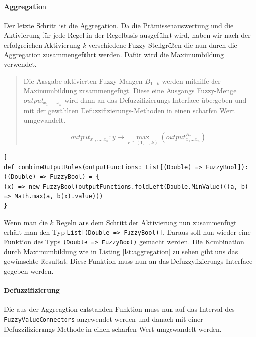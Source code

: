 \documentclass[12pt,a4paper,bibliography=totocnumbered,listof=totocnumbered, abstracton]{scrartcl}
\def\code#1{\texttt{#1}}
\theoremstyle{Umgebung}
\begin{document}
\paragraph{Aggregation}

Der letzte Schritt ist die Aggregation. Da die Prämissenauswertung und die Aktivierung für jede Regel in der Regelbasis ausgeführt wird, haben wir nach der erfolgreichen Aktivierung $k$ verschiedene Fuzzy-Stellgrößen die nun durch die Aggregation zusammengeführt werden. Dafür wird die Maximumbildung verwendet.

\begin{quote}
Die Ausgabe aktivierten Fuzzy-Mengen $B_{1...k}$ werden mithilfe der Maximumbildung zusammengefügt. Diese eine Ausgangs Fuzzy-Menge $	output_{x_1,..., x_n}$ wird dann an das Defuzzifizierungs-Interface übergeben und mit der gewählten Defuzzifizierungs-Methoden in einen scharfen Wert umgewandelt.

\begin{equation}
output_{x_1,..., x_n}: y \mapsto \max_{r \in (1,...,k)}(output^{R_r}_{x_1...x_n})
\end{equation}
\end{quote}

\begin{lstlisting}[firstnumber=1, style=myScalastyle, caption=Berechnung der Aggregation, label=lst:aggregation]]
def combineOutputRules(outputFunctions: List[(Double) => FuzzyBool]): ((Double) => FuzzyBool) = {
(x) => new FuzzyBool(outputFunctions.foldLeft(Double.MinValue)((a, b) => Math.max(a, b(x).value)))
}
\end{lstlisting}

Wenn man die $k$ Regeln aus dem Schritt der Aktivierung nun zusammenfügt erhält man den Typ \code{List[(Double => FuzzyBool)]}. Daraus soll nun wieder eine Funktion des Typs \code{(Double => FuzzyBool)} gemacht werden. Die Kombination durch Maximumbildung wie in Listing \ref{lst:aggregation} zu sehen gibt uns das gewünschte Resultat. Diese Funktion muss nun an das Defuzzyfizierungs-Interface gegeben werden.

\paragraph{Defuzzifizierung}

Die aus der Aggreagtion entstanden Funktion muss nun auf das Interval des \code{FuzzyValueConnectors} angewendet werden und danach mit einer Defuzzifizierungs-Methode in einen scharfen Wert umgewandelt werden.
\end{document}
